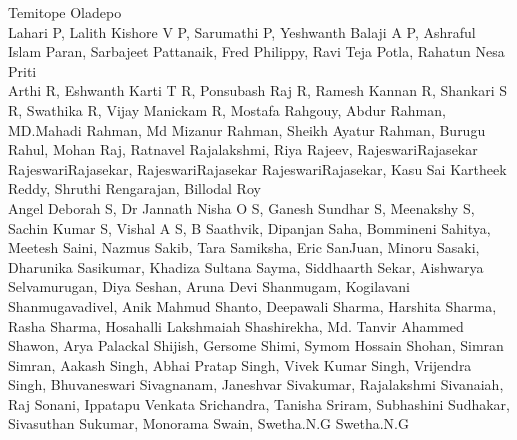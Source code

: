 \documentclass[11pt,oneside]{book}
\begin{document}
\begin{description}
      \newline
          Temitope Oladepo\\
      \newline
          Lahari P, Lalith Kishore V P, Sarumathi P, Yeshwanth Balaji A P, Ashraful Islam Paran, Sarbajeet Pattanaik, Fred Philippy, Ravi Teja Potla, Rahatun Nesa Priti\\
      \newline
          Arthi R, Eshwanth Karti T R, Ponsubash Raj R, Ramesh Kannan R, Shankari S R, Swathika R, Vijay Manickam R, Mostafa Rahgouy, Abdur Rahman, MD.Mahadi Rahman, Md Mizanur Rahman, Sheikh Ayatur Rahman, Burugu Rahul, Mohan Raj, Ratnavel Rajalakshmi, Riya Rajeev, RajeswariRajasekar RajeswariRajasekar, RajeswariRajasekar RajeswariRajasekar, Kasu Sai Kartheek Reddy, Shruthi Rengarajan, Billodal Roy\\
      \newline
          Angel Deborah S, Dr Jannath Nisha O S, Ganesh Sundhar S, Meenakshy S, Sachin Kumar S, Vishal A S, B Saathvik, Dipanjan Saha, Bommineni Sahitya, Meetesh Saini, Nazmus Sakib, Tara Samiksha, Eric SanJuan, Minoru Sasaki, Dharunika Sasikumar, Khadiza Sultana Sayma, Siddhaarth Sekar, Aishwarya Selvamurugan, Diya Seshan, Aruna Devi Shanmugam, Kogilavani Shanmugavadivel, Anik Mahmud Shanto, Deepawali Sharma, Harshita Sharma, Rasha Sharma, Hosahalli Lakshmaiah Shashirekha, Md. Tanvir Ahammed Shawon, Arya Palackal Shijish, Gersome Shimi, Symom Hossain Shohan, Simran Simran, Aakash Singh, Abhai Pratap Singh, Vivek Kumar Singh, Vrijendra Singh, Bhuvaneswari Sivagnanam, Janeshvar Sivakumar, Rajalakshmi Sivanaiah, Raj Sonani, Ippatapu Venkata Srichandra, Tanisha Sriram, Subhashini Sudhakar, Sivasuthan Sukumar, Monorama Swain, Swetha.N.G Swetha.N.G\\

\end{description}
\end{document}
